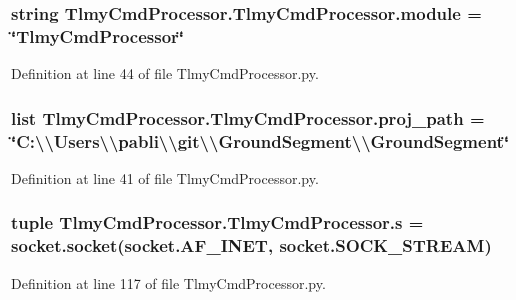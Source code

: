 \subsubsection[{module}]{\setlength{\rightskip}{0pt plus 5cm}string Tlmy\+Cmd\+Processor.\+Tlmy\+Cmd\+Processor.\+module = \char`\"{}Tlmy\+Cmd\+Processor\char`\"{}}\label{namespace_tlmy_cmd_processor_1_1_tlmy_cmd_processor_a8f2365862c9bbb4fe399b2d3f801b4d5}


Definition at line 44 of file Tlmy\+Cmd\+Processor.\+py.

\hypertarget{namespace_tlmy_cmd_processor_1_1_tlmy_cmd_processor_a9a897e168825a80d9ce9ed52e20010ef}{}
\subsubsection[{proj\+\_\+path}]{\setlength{\rightskip}{0pt plus 5cm}list Tlmy\+Cmd\+Processor.\+Tlmy\+Cmd\+Processor.\+proj\+\_\+path = \char`\"{}C\+:\textbackslash{}\textbackslash{}\+Users\textbackslash{}\textbackslash{}pabli\textbackslash{}\textbackslash{}git\textbackslash{}\textbackslash{}\+Ground\+Segment\textbackslash{}\textbackslash{}\+Ground\+Segment\char`\"{}}\label{namespace_tlmy_cmd_processor_1_1_tlmy_cmd_processor_a9a897e168825a80d9ce9ed52e20010ef}


Definition at line 41 of file Tlmy\+Cmd\+Processor.\+py.

\hypertarget{namespace_tlmy_cmd_processor_1_1_tlmy_cmd_processor_a5b740cec8cab496e71b6896c16dfba9d}{}
\subsubsection[{s}]{\setlength{\rightskip}{0pt plus 5cm}tuple Tlmy\+Cmd\+Processor.\+Tlmy\+Cmd\+Processor.\+s = socket.\+socket(socket.\+A\+F\+\_\+\+I\+N\+E\+T, socket.\+S\+O\+C\+K\+\_\+\+S\+T\+R\+E\+A\+M)}\label{namespace_tlmy_cmd_processor_1_1_tlmy_cmd_processor_a5b740cec8cab496e71b6896c16dfba9d}


Definition at line 117 of file Tlmy\+Cmd\+Processor.\+py.

